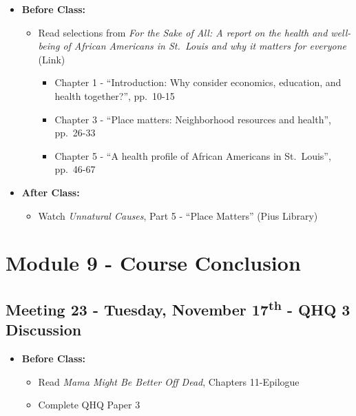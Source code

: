 \documentclass[
]{book}
\providecommand{\tightlist}{%
  \setlength{\itemsep}{0pt}\setlength{\parskip}{0pt}}
\begin{document}
\begin{itemize}
\tightlist
\item
  \textbf{Before Class:}

  \begin{itemize}
  \tightlist
  \item
    Read selections from \emph{For the Sake of All: A report on the health and well-being of African Americans in St.~Louis and why it matters for everyone} (Link)

    \begin{itemize}
    \tightlist
    \item
      Chapter 1 - ``Introduction: Why consider economics, education, and health together?'', pp.~10-15
    \item
      Chapter 3 - ``Place matters: Neighborhood resources and health'', pp.~26-33
    \item
      Chapter 5 - ``A health profile of African Americans in St.~Louis'', pp.~46-67
    \end{itemize}
  \end{itemize}
\item
  \textbf{After Class:}

  \begin{itemize}
  \tightlist
  \item
    Watch \emph{Unnatural Causes}, Part 5 - ``Place Matters'' (Pius Library)
  \end{itemize}
\end{itemize}

\newpage

\hypertarget{module-9---course-conclusion}{%
\section{Module 9 - Course Conclusion}\label{module-9---course-conclusion}}

\hypertarget{meeting-23---tuesday-november-17th---qhq-3-discussion}{%
\subsection*{\texorpdfstring{Meeting 23 - Tuesday, November 17\textsuperscript{th} - QHQ 3 Discussion}{Meeting 23 - Tuesday, November 17th - QHQ 3 Discussion}}\label{meeting-23---tuesday-november-17th---qhq-3-discussion}}

\begin{itemize}
\tightlist
\item
  \textbf{Before Class:}

  \begin{itemize}
  \tightlist
  \item
    Read \emph{Mama Might Be Better Off Dead}, Chapters 11-Epilogue
  \item
    Complete QHQ Paper 3
  \end{itemize}
\end{itemize}
\end{document}
